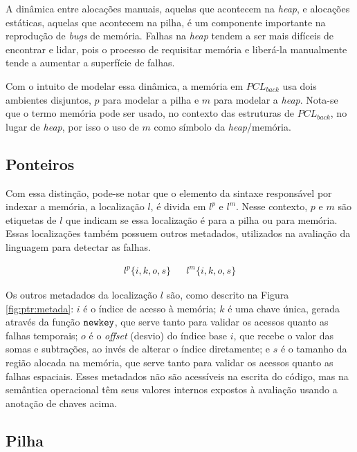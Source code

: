 A dinâmica entre alocações manuais, aquelas que acontecem na \emph{heap}, e alocações estáticas, aquelas que acontecem na pilha, é um componente importante na reprodução de \emph{bugs} de memória. Falhas na \emph{heap} tendem a ser mais difíceis de encontrar e lidar, pois o processo de requisitar memória e liberá-la manualmente tende a aumentar a superfície de falhas. 

Com o intuito de modelar essa dinâmica, a memória em $PCL_{back}$ usa dois ambientes disjuntos, $p$ para modelar a pilha e $m$ para modelar a \emph{heap}. Nota-se que o termo memória pode ser usado, no contexto das estruturas de $PCL_{back}$, no lugar de \emph{heap}, por isso o uso de $m$ como símbolo da \emph{heap}/memória.

\subsection{Ponteiros}
\label{sec:pcl-back:ptr}

Com essa distinção, pode-se notar que o elemento da sintaxe responsável por indexar a memória, a localização $l$, é divida em $l^p$ e $l^m$. Nesse contexto, $p$ e $m$ são etiquetas de $l$ que indicam se essa localização é para a pilha ou para memória. Essas localizações também possuem outros metadados, utilizados na avaliação da linguagem para detectar as falhas. 

\begin{figure*}[ht]
	\begin{align*}
		l^p\{i, k, o, s \} && l^m\{i, k, o, s \}
	\end{align*}
	\caption{\emph{Layout} dos metadados dos locais.}
	\label{fig:ptr:metada}
\end{figure*}

Os outros metadados da localização $l$ são, como descrito na Figura \ref{fig:ptr:metada}: $i$ é o índice de acesso à memória; $k$ é uma chave única, gerada através da função $\texttt{newkey}$, que serve tanto para validar os acessos quanto as falhas temporais; $o$ é o \emph{offset} (desvio) do índice base $i$, que recebe o valor das somas e subtrações, ao invés de alterar o índice diretamente; e $s$ é o tamanho da região alocada na memória, que serve tanto para validar os acessos quanto as falhas espaciais. Esses metadados não são acessíveis na escrita do código, mas na semântica operacional têm seus valores internos expostos à avaliação usando a anotação de chaves acima.

\subsection{Pilha}
\label{sec:pcl-back:pilha}

